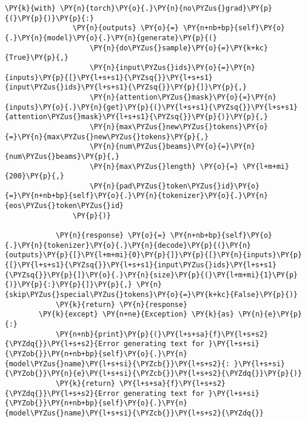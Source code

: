 \documentclass[11pt]{wseas}
\begin{document}
\begin{tcolorbox}[breakable, size=fbox, boxrule=1pt, pad at break*=1mm,colback=cellbackground, colframe=cellborder]
\begin{Verbatim}[commandchars=\\\{\}]
            \PY{k}{with} \PY{n}{torch}\PY{o}{.}\PY{n}{no\PYZus{}grad}\PY{p}{(}\PY{p}{)}\PY{p}{:}
                \PY{n}{outputs} \PY{o}{=} \PY{n+nb+bp}{self}\PY{o}{.}\PY{n}{model}\PY{o}{.}\PY{n}{generate}\PY{p}{(}
                    \PY{n}{do\PYZus{}sample}\PY{o}{=}\PY{k+kc}{True}\PY{p}{,}
                    \PY{n}{input\PYZus{}ids}\PY{o}{=}\PY{n}{inputs}\PY{p}{[}\PY{l+s+s1}{\PYZsq{}}\PY{l+s+s1}{input\PYZus{}ids}\PY{l+s+s1}{\PYZsq{}}\PY{p}{]}\PY{p}{,}
                    \PY{n}{attention\PYZus{}mask}\PY{o}{=}\PY{n}{inputs}\PY{o}{.}\PY{n}{get}\PY{p}{(}\PY{l+s+s1}{\PYZsq{}}\PY{l+s+s1}{attention\PYZus{}mask}\PY{l+s+s1}{\PYZsq{}}\PY{p}{)}\PY{p}{,}
                    \PY{n}{max\PYZus{}new\PYZus{}tokens}\PY{o}{=}\PY{n}{max\PYZus{}new\PYZus{}tokens}\PY{p}{,}
                    \PY{n}{num\PYZus{}beams}\PY{o}{=}\PY{n}{num\PYZus{}beams}\PY{p}{,}
                    \PY{n}{max\PYZus{}length} \PY{o}{=} \PY{l+m+mi}{200}\PY{p}{,}
                    \PY{n}{pad\PYZus{}token\PYZus{}id}\PY{o}{=}\PY{n+nb+bp}{self}\PY{o}{.}\PY{n}{tokenizer}\PY{o}{.}\PY{n}{eos\PYZus{}token\PYZus{}id}
                \PY{p}{)}

            \PY{n}{response} \PY{o}{=} \PY{n+nb+bp}{self}\PY{o}{.}\PY{n}{tokenizer}\PY{o}{.}\PY{n}{decode}\PY{p}{(}\PY{n}{outputs}\PY{p}{[}\PY{l+m+mi}{0}\PY{p}{]}\PY{p}{[}\PY{n}{inputs}\PY{p}{[}\PY{l+s+s1}{\PYZsq{}}\PY{l+s+s1}{input\PYZus{}ids}\PY{l+s+s1}{\PYZsq{}}\PY{p}{]}\PY{o}{.}\PY{n}{size}\PY{p}{(}\PY{l+m+mi}{1}\PY{p}{)}\PY{p}{:}\PY{p}{]}\PY{p}{,} \PY{n}{skip\PYZus{}special\PYZus{}tokens}\PY{o}{=}\PY{k+kc}{False}\PY{p}{)}
            \PY{k}{return} \PY{n}{response}
        \PY{k}{except} \PY{n+ne}{Exception} \PY{k}{as} \PY{n}{e}\PY{p}{:}
            \PY{n+nb}{print}\PY{p}{(}\PY{l+s+sa}{f}\PY{l+s+s2}{\PYZdq{}}\PY{l+s+s2}{Error generating text for }\PY{l+s+si}{\PYZob{}}\PY{n+nb+bp}{self}\PY{o}{.}\PY{n}{model\PYZus{}name}\PY{l+s+si}{\PYZcb{}}\PY{l+s+s2}{: }\PY{l+s+si}{\PYZob{}}\PY{n}{e}\PY{l+s+si}{\PYZcb{}}\PY{l+s+s2}{\PYZdq{}}\PY{p}{)}
            \PY{k}{return} \PY{l+s+sa}{f}\PY{l+s+s2}{\PYZdq{}}\PY{l+s+s2}{Error generating text for }\PY{l+s+si}{\PYZob{}}\PY{n+nb+bp}{self}\PY{o}{.}\PY{n}{model\PYZus{}name}\PY{l+s+si}{\PYZcb{}}\PY{l+s+s2}{\PYZdq{}}


\end{Verbatim}
\end{tcolorbox}
\end{document}
